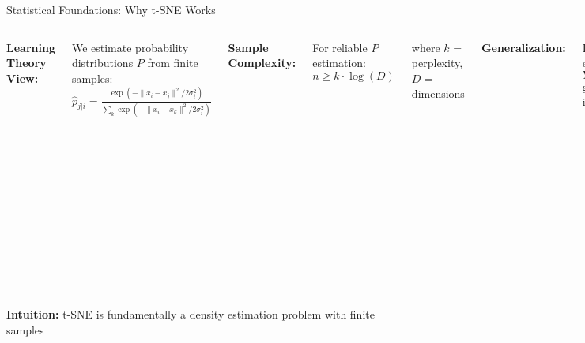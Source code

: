 \documentclass[aspectratio=169]{beamer}
\newcommand{\intuition}[1]{\colorbox{green!10}{\textcolor{intuitioncolor}{\textbf{Intuition:} #1}}}
\begin{document}
\begin{frame}{Statistical Foundations: Why t-SNE Works}
\begin{columns}
\textbf{Learning Theory View:}

We estimate probability distributions $P$ from finite samples:
$\hat{p}_{j|i} = \frac{\exp(-\|x_i-x_j\|^2/2\sigma_i^2)}{\sum_k \exp(-\|x_i-x_k\|^2/2\sigma_i^2)}$

\textbf{Sample Complexity:}

For reliable $P$ estimation:
$n \geq k \cdot \log(D)$

where $k$ = perplexity, $D$ = dimensions

\textbf{Generalization:}

Low-D embedding $Y$ generalizes if:
\begin{itemize}
\item High-D neighborhoods stable
\item Sufficient samples per region
\item Validation confirms structure
\end{itemize}


\vspace{0.2cm}
\textbf{Failure Modes:}
\begin{itemize}
\item Too few samples: noise dominates
\item Too high perplexity: smooths real structure
\item Too low perplexity: overfits noise
\end{itemize}
\end{columns}

\vspace{0.3cm}
\intuition{t-SNE is fundamentally a density estimation problem with finite samples}
\end{frame}
\end{document}
